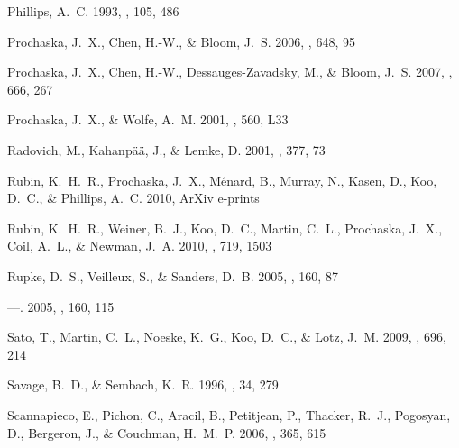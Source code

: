 \documentclass[12pt,preprint]{aastex}
\begin{document}
\begin{thebibliography}{74}
{Phillips}, A.~C. 1993, \aj, 105, 486

{Prochaska}, J.~X., {Chen}, H.-W., \& {Bloom}, J.~S. 2006, \apj, 648, 95

{Prochaska}, J.~X., {Chen}, H.-W., {Dessauges-Zavadsky}, M., \& {Bloom}, J.~S.
  2007, \apj, 666, 267

{Prochaska}, J.~X., \& {Wolfe}, A.~M. 2001, \apjl, 560, L33

{Radovich}, M., {Kahanp{\"a}{\"a}}, J., \& {Lemke}, D. 2001, \aap, 377, 73

{Rubin}, K.~H.~R., {Prochaska}, J.~X., {M{\'e}nard}, B., {Murray}, N., {Kasen},
  D., {Koo}, D.~C., \& {Phillips}, A.~C. 2010{}, ArXiv e-prints

{Rubin}, K.~H.~R., {Weiner}, B.~J., {Koo}, D.~C., {Martin}, C.~L., {Prochaska},
  J.~X., {Coil}, A.~L., \& {Newman}, J.~A. 2010{}, \apj, 719, 1503

{Rupke}, D.~S., {Veilleux}, S., \& {Sanders}, D.~B. 2005{}, \apjs,
  160, 87

---. 2005{}, \apjs, 160, 115

{Sato}, T., {Martin}, C.~L., {Noeske}, K.~G., {Koo}, D.~C., \& {Lotz}, J.~M.
  2009, \apj, 696, 214

{Savage}, B.~D., \& {Sembach}, K.~R. 1996, \araa, 34, 279

{Scannapieco}, E., {Pichon}, C., {Aracil}, B., {Petitjean}, P., {Thacker},
  R.~J., {Pogosyan}, D., {Bergeron}, J., \& {Couchman}, H.~M.~P. 2006, \mnras,
  365, 615


\end{thebibliography}
\end{document}
